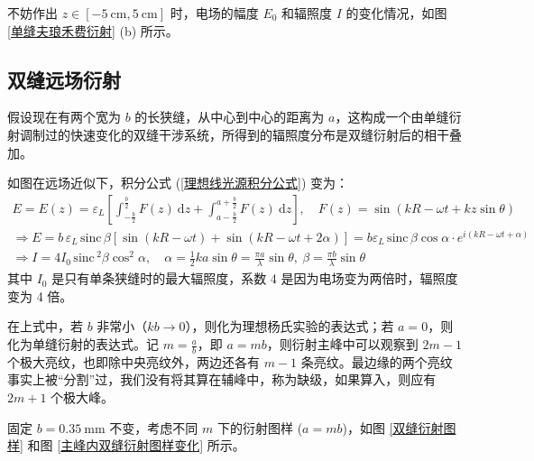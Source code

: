 \documentclass[UTF8]{report}
\def\sinc{\mathrm{\,sinc}\,}
\theoremstyle{MyLineTheoremStyle} %
\theoremstyle{MyBlockTheoremStyle} %
\theoremstyle{MySubsubsectionStyle} %
\begin{document}
不妨作出 $z \in [-5 \ \mathrm{cm}, 5 \ \mathrm{cm}]$ 时，电场的幅度 $E_0$ 和辐照度 $I$ 的变化情况，如图 \ref{单缝夫琅禾费衍射} (b) 所示。


\subsection{双缝远场衍射}

假设现在有两个宽为 $b$ 的长狭缝，从中心到中心的距离为 $a$，这构成一个由单缝衍射调制过的快速变化的双缝干涉系统，所得到的辐照度分布是双缝衍射后的相干叠加。

如图在远场近似下，积分公式 (\ref{理想线光源积分公式}) 变为：
\begin{gather}
E  = E(z)= \varepsilon_L \left[\int_{-\frac{b}{2}}^{\frac{b}{2}} F(z) \ \mathrm{d}z + \int_{a-\frac{b}{2}}^{a+\frac{b}{2}} F(z) \ \mathrm{d}z\right]
,\quad F(z) = \sin \left(kR - \omega t + kz \sin \theta\right) \\ 
\Longrightarrow E = b\,\varepsilon_L \sinc \beta \left[\sin (kR - \omega t) + \sin (kR - \omega t + 2\alpha)\right] = b\varepsilon_L \sinc \beta \cos \alpha \cdot e^{i(kR - \omega t + \alpha)} \\ 
\Longrightarrow I = 4 I_0 \sinc^2 \beta \cos^2 \alpha,\quad \alpha = \frac{1}{2}k a \sin \theta = \frac{\pi a}{\lambda} \sin \theta,\ \beta = \frac{\pi b}{\lambda} \sin \theta
\end{gather}
其中 $I_0$ 是只有单条狭缝时的最大辐照度，系数 4 是因为电场变为两倍时，辐照度变为 4 倍。

在上式中，若 $b$ 非常小（$kb \to 0$），则化为理想杨氏实验的表达式；若 $a = 0$，则化为单缝衍射的表达式。记 $m = \frac{a}{b}$，即 $a = mb$，则衍射主峰中可以观察到 $2m-1$ 个极大亮纹，也即除中央亮纹外，两边还各有 $m-1$ 条亮纹。最边缘的两个亮纹事实上被“分割”过，我们没有将其算在辅峰中，称为缺级，如果算入，则应有 $2m + 1$ 个极大峰。



固定 $b = 0.35 \ \mathrm{mm}$ 不变，考虑不同 $m$ 下的衍射图样 ($a = mb$)，如图 \ref{双缝衍射图样} 和图 \ref{主峰内双缝衍射图样变化} 所示。
\end{document}
